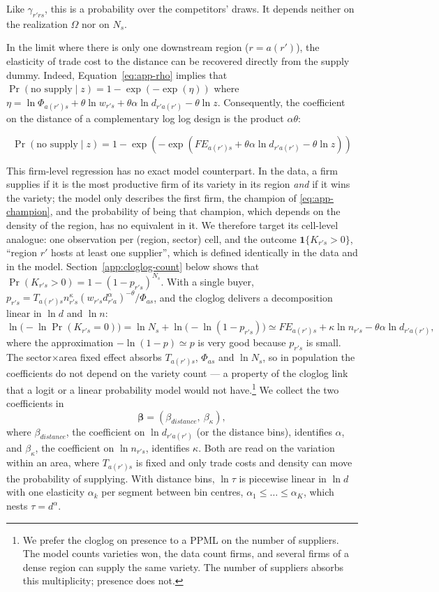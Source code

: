 Like $\gamma_{r'rs}$, this is a probability over the competitors' draws. It depends neither on the realization $\Omega$ nor on $N_s$.
 
In the limit where there is only one downstream region ($r = a(r')$), the elasticity of trade cost to the distance can be recovered directly from the supply dummy. Indeed, Equation~\eqref{eq:app-rho} implies that $\Pr(\text{no supply} \mid z) = 1 - \exp(-\exp(\eta))$ where $\eta = \ln \Phi_{a(r')s} + \theta \ln w_{r's} + \theta \alpha \ln d_{r'a(r')} - \theta \ln z$. Consequently, the coefficient on the distance of a complementary log log design is the product $\alpha\theta$:
 
$$
\Pr(\text{no supply} \mid z) = 1 - \exp(-\exp(FE_{a(r')s} + \theta \alpha \ln d_{r'a(r')} - \theta \ln z))
$$

This firm-level regression has no exact model counterpart. In the data, a firm supplies if it is the most productive firm of its variety in its region \emph{and} if it wins the variety; the model only describes the first firm, the champion of \eqref{eq:app-champion}, and the probability of being that champion, which depends on the density of the region, has no equivalent in it. We therefore target its cell-level analogue: one observation per (region, sector) cell, and the outcome $\mathbf{1}\{K_{r's}>0\}$, ``region $r'$ hosts at least one supplier'', which is defined identically in the data and in the model. Section~\ref{app:cloglog-count} below shows that $\Pr(K_{r's}>0)=1-(1-p_{r's})^{N_s}$. With a single buyer, $p_{r's}=T_{a(r')s}n_{r's}^{\kappa}(w_{r's}d_{r'a}^{\alpha})^{-\theta}/\Phi_{as}$, and the cloglog delivers a decomposition linear in $\ln d$ and $\ln n$:
\begin{equation}
\ln\big(-\ln \Pr(K_{r's}=0)\big)=\ln N_s+\ln\big(-\ln(1-p_{r's})\big)\simeq FE_{a(r')s}+\kappa\ln n_{r's}-\theta\alpha\ln d_{r'a(r')},
\label{eq:app-cell-cloglog}
\end{equation}
where the approximation $-\ln(1-p)\simeq p$ is very good because $p_{r's}$ is small. The sector$\times$area fixed effect absorbs $T_{a(r')s}$, $\Phi_{as}$ and $\ln N_s$, so in population the coefficients do not depend on the variety count --- a property of the cloglog link that a logit or a linear probability model would not have.\footnote{We prefer the cloglog on presence to a PPML on the number of suppliers. The model counts varieties won, the data count firms, and several firms of a dense region can supply the same variety. The number of suppliers absorbs this multiplicity; presence does not.} We collect the two coefficients in
\begin{equation}
\boldsymbol\beta=(\beta_{distance},\ \beta_{\kappa}),
\label{eq:app-beta}
\end{equation}
where $\beta_{distance}$, the coefficient on $\ln d_{r'a(r')}$ (or the distance bins), identifies $\alpha$, and $\beta_{\kappa}$, the coefficient on $\ln n_{r's}$, identifies $\kappa$. Both are read on the variation within an area, where $T_{a(r')s}$ is fixed and only trade costs and density can move the probability of supplying. With distance bins, $\ln\tau$ is piecewise linear in $\ln d$ with one elasticity $\alpha_k$ per segment between bin centres, $\alpha_1\le\dots\le\alpha_K$, which nests $\tau=d^{\alpha}$.
 
